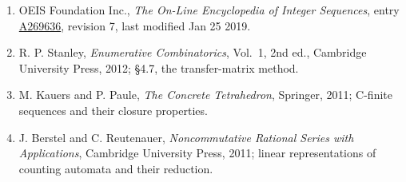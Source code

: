 \documentclass[11pt]{article}
\theoremstyle{definition}
\begin{document}
\begin{enumerate}

\item OEIS Foundation Inc., \emph{The On-Line Encyclopedia of Integer Sequences}, entry \href{https://oeis.org/A269636}{A269636}, revision 7, last modified Jan 25 2019.

\item R. P. Stanley, \emph{Enumerative Combinatorics}, Vol.~1, 2nd ed., Cambridge University Press, 2012; \S4.7, the transfer-matrix method.

\item M. Kauers and P. Paule, \emph{The Concrete Tetrahedron}, Springer, 2011; C-finite sequences and their closure properties.

\item J. Berstel and C. Reutenauer, \emph{Noncommutative Rational Series with Applications}, Cambridge University Press, 2011; linear representations of counting automata and their reduction.

\end{enumerate}
\end{document}
